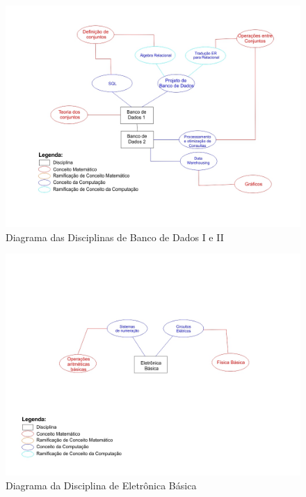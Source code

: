 \documentclass[12pt,a4paper]{article}
\begin{document}
\begin{figure}[!h]
	\centering
	\includegraphics[scale=0.5]{imagens/DiagramaBancoDeDados1e2.jpg} 
	\caption{Diagrama das Disciplinas de Banco de Dados I e II}
\end{figure}

\begin{figure}[!h]
	\centering
	\includegraphics[scale=0.5]{imagens/Diagrama Eletronica Basica.jpg} 
	\caption{Diagrama da Disciplina de Eletrônica Básica}
\end{figure}
\end{document}

